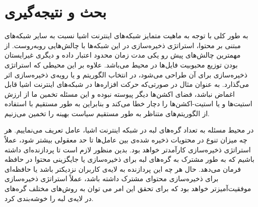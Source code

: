 \chapter{بحث و نتیجه‌گیری}
به طور کلی با توجه به ماهیت متمایز شبکه‌های اینترنت اشیا نسبت به سایر شبکه‌های مبتنی بر محتوا، استراتژی ذخیره‌سازی در این شبکه‌ها با چالش‌هایی روبه‌روست. از مهمترین چالش‌های پیش رو یکی مدت زمان محدود اعتبار داده و دیگری غیرایستان بودن توزیع محبوبیت فایل‌ها در محیط می‌باشد. علاوه بر این محیطی که استراتژی ذخیره‌سازی برای آن طراحی ‌می‌شود، در انتخاب الگوریتم و یا رویه‌ی ذخیره‌سازی اثر می‌گذارد. به عنوان مثال در صورتی‌که حرکت افزاره‌ها در شبکه‌های اینترنت اشیا قابل اغماض نباشد، فضای اکشن‌ها دیگر پیوسته نبوده و این مسئله تخمین ما از ارزش استیت‌ها و یا استیت-اکشن‌ها را دچار خطا می‌کند و بنابراین به طور مستقیم با استفاده از الگوریتم‌های متناظر به طور مستقیم سیاست بهینه را تخمین می‌زنیم. 

در محیط مسئله به تعداد گره‌های لبه در شبکه اینترنت اشیا، عامل تعریف می‌نماییم. هر چه میزان تنوع در محتویات ذخیره شده‌ی بین عامل‌ها تا حد معقولی بیشتر شود، عملاً استراتژی ذخیره‌سازی کارآمدتر خواهد بود. بدین منظور لازم است تا پردازنده‌ای داشته باشیم که به طور مشترک به گره‌های لبه برای ذخیره‌سازی یا جایگزینی محتوا در حافظه فرمان می‌دهد. حال هر چه این پردازنده به لایه‌ی کاربران نزدیکتر باشد یا حافظه‌ای برای ذخیره‌سازی محتوای مشترک داشته باشد،‌ عملاً استراتژی ذخیره‌سازی موفقیت‌آمیزتر خواهد بود که برای تحقق این امر می توان به روش‌های مختلف گره‌های در لایه‌ی لبه را خوشه‌بندی کرد.
